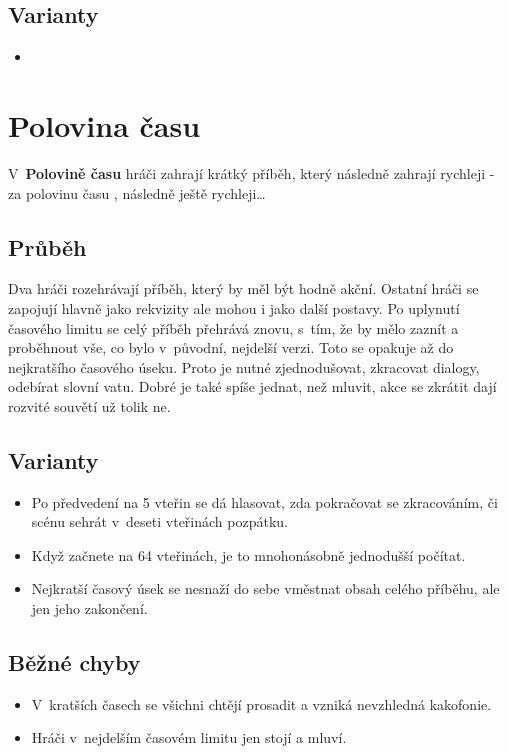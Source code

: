 \subsection{Varianty} \begin{itemize}
\item {}
\end{itemize}
 
 
 
 
 
\needspace{5cm} \section{Polovina času} \label{polovina času}  
 
V~\textbf{Polovině času} hráči zahrají krátký příběh, který následně zahrají rychleji -  za polovinu času , následně ještě rychleji… 
 
\subsection{ Průběh } Dva hráči rozehrávají příběh, který by měl být hodně akční. Ostatní hráči se zapojují hlavně jako rekvizity ale mohou i jako další postavy. Po uplynutí časového limitu se celý příběh přehrává znovu, s~tím, že by mělo zaznít a proběhnout vše, co bylo v~původní, nejdelší verzi. Toto se opakuje až do nejkratšího časového úseku. Proto je nutné zjednodušovat, zkracovat dialogy, odebírat slovní vatu. Dobré je také spíše jednat, než mluvit, akce se zkrátit dají rozvité souvětí už tolik ne. 
 
\subsection{ Varianty } \begin{itemize}
\item Po předvedení na 5 vteřin se dá hlasovat, zda pokračovat se zkracováním, či scénu sehrát v~deseti vteřinách pozpátku.
\item Když začnete na 64 vteřinách, je to mnohonásobně jednodušší počítat.
\item Nejkratší časový úsek se nesnaží do sebe vměstnat obsah celého příběhu, ale jen jeho zakončení.
\end{itemize}
 
\subsection{ Běžné chyby } \begin{itemize}
\item V~kratších časech se všichni chtějí prosadit a vzniká nevzhledná kakofonie.
\item Hráči v~nejdelším časovém limitu jen stojí a mluví.
\end{itemize}
 
